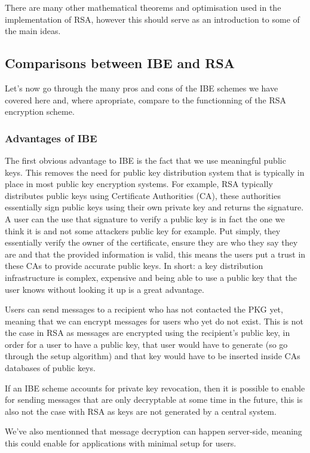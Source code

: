 \documentclass[conference]{IEEEtran}
\begin{document}
There are many other mathematical theorems and optimisation
used in the implementation of RSA, however this should serve as an introduction
to some of the main ideas.


\subsection{Comparisons between IBE and RSA}
Let's now go through the many pros and cons of the IBE schemes we 
have covered here and, where apropriate, compare to the functionning of the 
RSA encryption scheme.


\subsubsection{Advantages of IBE}
The first obvious advantage to IBE is the fact that we use 
meaningful public keys. This removes the need for public key distribution system
that is typically in place in most public key encryption systems. For example,
RSA typically distributes public keys using Certificate Authorities (CA), these authorities
essentially sign public keys using their own private key and returns the signature. A user
can the use that signature to verify a public key is in fact the one we think it is 
and not some attackers public key for example. Put simply, 
they essentially verify the owner of the certificate, 
ensure they are who they say they are and that the provided information is valid, this
means the users put a trust in these CAs to provide accurate public keys.
In short: a key distribution infrastructure is complex, expensive and being able to 
use a public key that the user knows without looking it up is a great advantage.


Users can send messages to a recipient who has not contacted the PKG yet, meaning that 
we can encrypt messages for users who yet do not exist. This is not the case in RSA
as messages are encrypted using the recipient's public key, in order for a user to have a 
public key, that user would have to generate (so go through the setup algorithm) and 
that key would have to be inserted inside CAs databases of public keys.

If an IBE scheme accounts for private key revocation, then it is possible to enable for 
sending messages that are only decryptable at some time in the future, this is also not the 
case with RSA as keys are not generated by a central system.


We've also mentionned that message decryption can happen server-side, meaning 
this could enable for applications with minimal setup for users.
 
\end{document}
